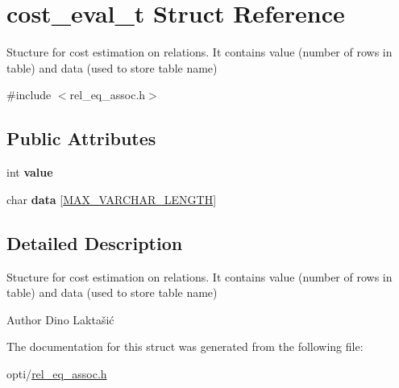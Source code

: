 \hypertarget{structcost__eval__t}{}\section{cost\+\_\+eval\+\_\+t Struct Reference}
\label{structcost__eval__t}


Stucture for cost estimation on relations. It contains value (number of rows in table) and data (used to store table name)  




{\ttfamily \#include $<$rel\+\_\+eq\+\_\+assoc.\+h$>$}

\subsection*{Public Attributes}
\begin{DoxyCompactItemize}
\item 
\mbox{\label{structcost__eval__t_ab6682b6adcf408d8d22ed0b7f03ca5d9}} 
int {\bfseries value}
\item 
\mbox{\label{structcost__eval__t_ad33dd7ac629ddfbacc965bc1cf5f07ac}} 
char {\bfseries data} \mbox{[}\hyperlink{constants_8h_a9de30df5b4220028fba997e5def2e9d7}{M\+A\+X\+\_\+\+V\+A\+R\+C\+H\+A\+R\+\_\+\+L\+E\+N\+G\+TH}\mbox{]}
\end{DoxyCompactItemize}


\subsection{Detailed Description}
Stucture for cost estimation on relations. It contains value (number of rows in table) and data (used to store table name) 

\begin{DoxyAuthor}{Author}
Dino Laktašić 
\end{DoxyAuthor}


The documentation for this struct was generated from the following file\+:\begin{DoxyCompactItemize}
\item 
opti/\hyperlink{rel__eq__assoc_8h}{rel\+\_\+eq\+\_\+assoc.\+h}\end{DoxyCompactItemize}
